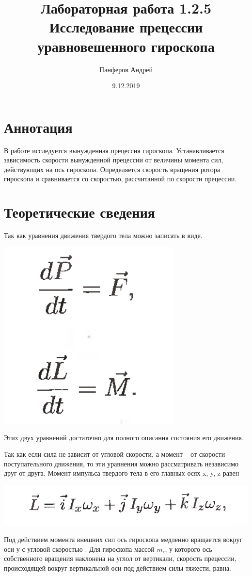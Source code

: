 \documentclass{article}
\title{Лабораторная работа 1.2.5\\Исследование прецессии уравновешенного гироскопа}
\date{9.12.2019}
\author{Панферов Андрей}
\begin{document}
  \maketitle
  \newpage
  
  

\section{Аннотация}

В работе исследуется вынужденная прецессия гироскопа. Устанавливается зависимость скорости вынужденной прецессии от величины момента сил, действующих на ось гироскопа. Определяется скорость вращения ротора гироскопа и сравнивается со скоростью, рассчитанной по скорости прецессии. 


\section{Теоретические сведения}

Так как уравнения движения твердого тела можно записать в виде. 

\begin{center}

  \includegraphics[width=0.1\linewidth]{IMG_1.jpg}\\
 
 \end{center}


Этих двух уравнений достаточно для полного описания состояния его движения. 

Так как если сила не зависит от угловой скорости, а момент -- от скорости поступательного движения, то эти уравнения можно рассматривать независимо друг от друга. 
Момент импульса твердого тела в его главных осях x, y, z равен

\begin{center}

  \includegraphics[width=0.4\linewidth]{IMG_2.jpg}\\
 
 \end{center}
Под действием момента внешних сил ось гироскопа медленно вращается вокруг оси у с угловой скоростью \Omega. Для гироскопа  массой $m_г$, у которого ось собственного вращения наклонена на углол \alpha от вертикали, скорость прецессии, происходящей вокруг вертикальной оси под действием силы тяжести, равна. 
\end{document}
